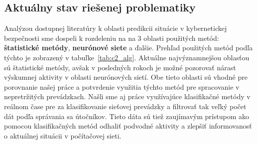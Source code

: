 \documentclass[thesismargins, thesislinespacing, openright, upjsfrontpage, combineabstracts]{rnthesis}
\begin{document}
\subsection{Aktuálny stav riešenej problematiky}

Analýzou dostupnej literatúry k oblasti predikcii situácie v kybernetickej bezpečnosti sme dospeli k rozdeleniu na na 3 oblasti použitých metód:
\textbf{štatistické metódy}, \textbf{neurónové siete} a ďalšie. Prehľad použitých metód podľa týchto je zobrazený v tabuľke~\ref{tab:c2_alg}. Aktuálne najvýznamnejšou oblasťou sú štatistické metódy, avšak v posledných rokoch je možné pozorovať nárast výskumnej aktivity v oblasti neurónových sietí. Obe tieto oblasti sú vhodné pre porovnanie našej práce a potvrdenie využitia týchto metód pre spracovanie v nepretržitých prevádzkach. Našli sme aj práce využívajúce klasifikačné metódy v reálnom čase pre za klasifikovanie sieťovej prevádzky a filtrovať tak veľký počet dát podľa správania sa útočníkov. Tieto dáta sú tiež zaujímavým prístupom ako pomocou klasifikačných metód odhaliť podvodné aktivity a zlepšiť informovanosť o aktuálnej situácii v počítačovej sieti.
\end{document}

